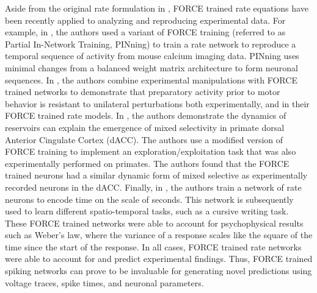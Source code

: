 \documentclass[11pt]{article} %
\begin{document}
 
Aside from the original rate formulation in \cite{FORCE1}, FORCE trained rate equations have been recently applied to analyzing and reproducing experimental data.  For example, in \cite{Rajan2}, the authors used a variant of FORCE training (referred to as Partial In-Network Training, PINning) to train a rate network to reproduce a temporal sequence of activity from mouse calcium imaging data.  PINning uses
 minimal changes from a balanced weight matrix architecture to form neuronal sequences.   In \cite{DRUCK}, the authors combine experimental manipulations with FORCE trained networks to demonstrate that preparatory activity prior to motor behavior is resistant to unilateral perturbations both experimentally, and in their FORCE trained rate models.   In \cite{Enel}, the authors demonstrate the dynamics of reservoirs can explain the emergence of mixed selectivity in primate dorsal Anterior Cingulate Cortex (dACC).  The authors use a modified version of FORCE training to implement an exploration/exploitation task that was also experimentally performed on primates.  The authors found that the FORCE trained neurons had a similar dynamic form of mixed selective as experimentally recorded neurons in the dACC.  Finally, in \cite{B3}, the authors train a network of rate neurons to encode time on the scale of seconds.  This network is subsequently used to learn different spatio-temporal tasks, such as a cursive writing task.  These FORCE trained networks were able to account for psychophysical results such as Weber's law, where the variance of a response scales like the square of the time since the start of the response.  In all cases, FORCE trained rate networks were able to account for and predict experimental findings.  Thus, FORCE trained spiking networks can prove to be invaluable for generating novel predictions using voltage traces, spike times, and neuronal parameters.  
\end{document}
